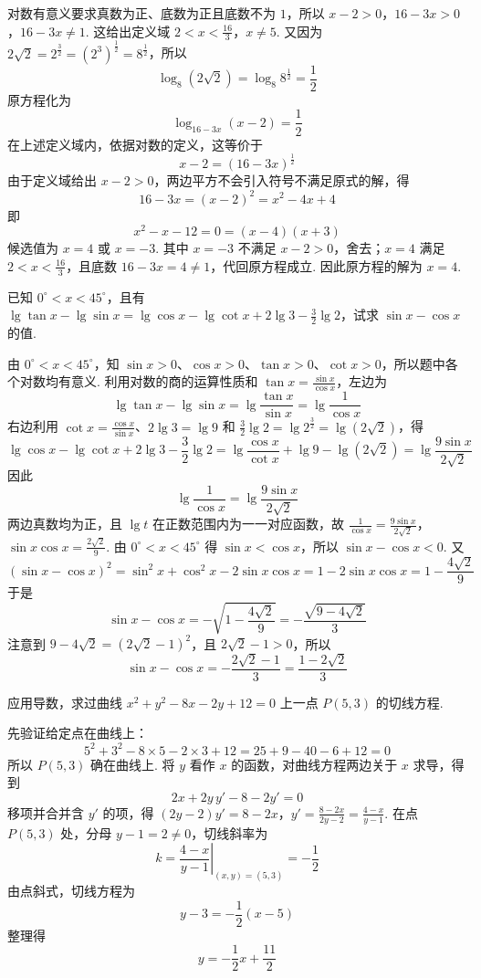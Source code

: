 \begin{solution}
对数有意义要求真数为正、底数为正且底数不为 \(1\)，所以
\(x-2>0\)，\(16-3x>0\)，\(16-3x\neq1\).
这给出定义域
\(2<x<\frac{16}{3}\)，\(x\neq5\).
又因为 \(2\sqrt2=2^{\frac32}=\left(2^3\right)^{\frac12}=8^{\frac12}\)，所以
\[
\log_8\left(2\sqrt2\right)=\log_8 8^{\frac12}=\frac12
\]
原方程化为
\[
\log_{16-3x}\left(x-2\right)=\frac12
\]
在上述定义域内，依据对数的定义，这等价于
\[
x-2=\left(16-3x\right)^{\frac12}
\]
由于定义域给出 \(x-2>0\)，两边平方不会引入符号不满足原式的解，得
\[
16-3x=(x-2)^2=x^2-4x+4
\]
即
\[
x^2-x-12=0=(x-4)(x+3)
\]
候选值为 \(x=4\) 或 \(x=-3\). 其中 \(x=-3\) 不满足 \(x-2>0\)，舍去；\(x=4\) 满足 \(2<x<\frac{16}{3}\)，且底数 \(16-3x=4\neq1\)，代回原方程成立. 因此原方程的解为 \(x=4\).
\end{solution}

\begin{problem}
已知 \(0^\circ<x<45^\circ\)，且有
\(\lg\tan x-\lg\sin x=\lg\cos x-\lg\cot x+2\lg3-\frac32\lg2\)，试求 \(\sin x-\cos x\) 的值.
\end{problem}

\begin{solution}
由 \(0^\circ<x<45^\circ\)，知 \(\sin x>0\)、\(\cos x>0\)、\(\tan x>0\)、\(\cot x>0\)，所以题中各个对数均有意义. 利用对数的商的运算性质和 \(\tan x=\frac{\sin x}{\cos x}\)，左边为
\[
\lg\tan x-\lg\sin x
=\lg\frac{\tan x}{\sin x}
=\lg\frac{1}{\cos x}
\]
右边利用 \(\cot x=\frac{\cos x}{\sin x}\)、\(2\lg3=\lg9\) 和 \(\frac32\lg2=\lg2^{\frac32}=\lg(2\sqrt2)\)，得
\[
\lg\cos x-\lg\cot x+2\lg3-\frac32\lg2
=\lg\frac{\cos x}{\cot x}+\lg9-\lg(2\sqrt2)
=\lg\frac{9\sin x}{2\sqrt2}
\]
因此
\[
\lg\frac1{\cos x}=\lg\frac{9\sin x}{2\sqrt2}
\]
两边真数均为正，且 \(\lg t\) 在正数范围内为一一对应函数，故
\(\frac1{\cos x}=\frac{9\sin x}{2\sqrt2}\)，\(\sin x\cos x=\frac{2\sqrt2}{9}\).
由 \(0^\circ<x<45^\circ\) 得 \(\sin x<\cos x\)，所以 \(\sin x-\cos x<0\). 又
\[
\left(\sin x-\cos x\right)^2
=\sin^2x+\cos^2x-2\sin x\cos x
=1-2\sin x\cos x
=1-\frac{4\sqrt2}{9}
\]
于是
\[
\sin x-\cos x=-\sqrt{1-\frac{4\sqrt2}{9}}
=-\frac{\sqrt{9-4\sqrt2}}{3}
\]
注意到 \(9-4\sqrt2=(2\sqrt2-1)^2\)，且 \(2\sqrt2-1>0\)，所以
\[
\sin x-\cos x=-\frac{2\sqrt2-1}{3}=\frac{1-2\sqrt2}{3}
\]
\end{solution}

\begin{problem}
应用导数，求过曲线 \(x^2+y^2-8x-2y+12=0\) 上一点 \(P\left(5,3\right)\) 的切线方程.
\end{problem}

\begin{solution}
先验证给定点在曲线上：
\[
5^2+3^2-8\times5-2\times3+12=25+9-40-6+12=0
\]
所以 \(P\left(5,3\right)\) 确在曲线上. 将 \(y\) 看作 \(x\) 的函数，对曲线方程两边关于 \(x\) 求导，得到
\[
2x+2y\,y'-8-2y'=0
\]
移项并合并含 \(y'\) 的项，得
\((2y-2)y'=8-2x\)，\(y'=\frac{8-2x}{2y-2}=\frac{4-x}{y-1}\).
在点 \(P\left(5,3\right)\) 处，分母 \(y-1=2\neq0\)，切线斜率为
\[
k=\left.\frac{4-x}{y-1}\right|_{(x,y)=(5,3)}=-\frac12
\]
由点斜式，切线方程为
\[
y-3=-\frac12\left(x-5\right)
\]
整理得
\[
y=-\frac12x+\frac{11}{2}
\]
\end{solution}


